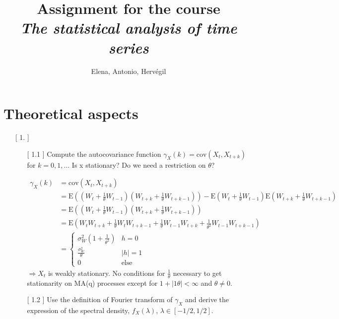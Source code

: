 \documentclass[10pt,a4paper]{article}
\author{Elena, Antonio, Hervégil}
\title{Assignment for the course \\ \textit{The statistical analysis of time series}}
\begin{document}
	\maketitle
	\newpage
	\section{Theoretical aspects}
	\begin{enumerate}
	\item[[ 1.]] \begin{enumerate}
			\item[[ 1.1]] Compute the autocovariance function $\gamma_{X} (k) = \text{cov}(X_t,X_{t+k})$ for $k=0,1,\dots$ Is { \selectfont \large  x } stationary? Do we need a restriction on $\theta$?
			
			\begin{align*}
				\gamma_{X}(k) &= \text{cov}(X_t,X_{t+k}) \\
				&= \text{E}((W_t+\frac{1}{\theta} W_{t-1})(W_{t+k}+\frac{1}{\theta}W_{t+k-1})) - \text{E}(W_t+\frac{1}{\theta} W_{t-1})\text{E}(W_{t+k}+\frac{1}{\theta}W_{t+k-1}) \\
				&= \text{E}((W_t+\frac{1}{\theta} W_{t-1})(W_{t+k}+\frac{1}{\theta}W_{t+k-1})) \\
				&= \text{E}(W_tW_{t+k} + \frac{1}{\theta} W_tW_{t+k-1}+\frac{1}{\theta} W_{t-1}W_{t+k} + \frac{1}{\theta^2} W_{t-1}W_{t+k-1}) \\
				&= 	\left\{
							\begin{array}{ll}
								\sigma^2_{W} (1+\frac{1}{\theta^2}) & h=0\\
								\frac{\sigma^2_{W}}{\theta} & |h|=1\\
								0 & \text{else}
							\end{array}
					\right.			
			\end{align*}		
			$\Rightarrow X_{t}$ is weakly stationary. No conditions for $\frac{1}{\theta}$ necessary to get stationarity on MA(q) processes except for $1+|1\theta| < \infty$ and $\theta \neq 0$. 
			
			
			
			\item[[ 1.2]] Use the definition of Fourier transform of $\gamma_X$ and derive the expression of the spectral density, $f_X(\lambda)$, $\lambda \in \left[-1/2,1/2\right]$.
			

\end{enumerate}
\end{enumerate}
\end{document}
